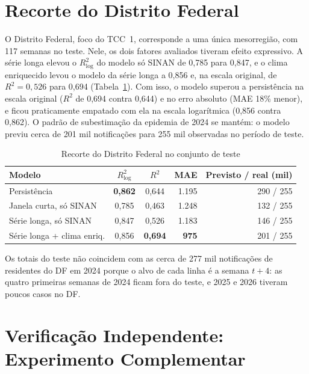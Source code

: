 \section{Recorte do Distrito Federal}
\label{sec:res_df}

O Distrito Federal, foco do TCC~1, corresponde a uma única mesorregião, com 117 semanas no teste. Nele, os dois fatores avaliados tiveram efeito expressivo. A série longa elevou o $R^2_{\log}$ do modelo só SINAN de 0,785 para 0,847, e o clima enriquecido levou o modelo da série longa a 0,856 e, na escala original, de $R^2=0{,}526$ para 0,694 (Tabela~\ref{tab:df}). Com isso, o modelo superou a persistência na escala original ($R^2$ de 0,694 contra 0,644) e no erro absoluto (MAE 18\% menor), e ficou praticamente empatado com ela na escala logarítmica (0,856 contra 0,862). O padrão de subestimação da epidemia de 2024 se mantém: o modelo previu cerca de 201 mil notificações para 255 mil observadas no período de teste.

\begin{table}[htb]
\centering
\caption{Recorte do Distrito Federal no conjunto de teste}
\label{tab:df}
\small
\begin{tabular}{|l|c|c|r|r|}
\hline
\textbf{Modelo} & \textbf{$R^2_{\log}$} & \textbf{$R^2$} & \textbf{MAE} & \textbf{Previsto / real (mil)} \\ \hline
Persistência & \textbf{0,862} & 0,644 & 1.195 & 290 / 255 \\ \hline
Janela curta, só SINAN & 0,785 & 0,463 & 1.248 & 132 / 255 \\ \hline
Série longa, só SINAN & 0,847 & 0,526 & 1.183 & 146 / 255 \\ \hline
Série longa + clima enriq. & 0,856 & \textbf{0,694} & \textbf{975} & 201 / 255 \\ \hline
\end{tabular}
\end{table}

Os totais do teste não coincidem com as cerca de 277 mil notificações de residentes do DF em 2024 porque o alvo de cada linha é a semana $t+4$: as quatro primeiras semanas de 2024 ficam fora do teste, e 2025 e 2026 tiveram poucos casos no DF.

\section{Verificação Independente: Experimento Complementar}
\label{sec:res_complementar}

